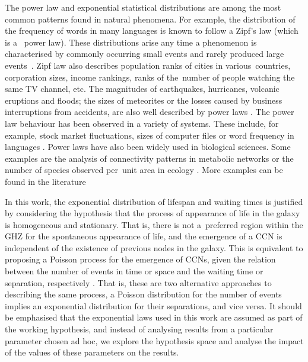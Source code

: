 \documentclass[crop]{CSLB}
\newcommand{\ceti}{CCN}
\newcommand{\cetis}{CCNs}
\begin{document}
The power law and exponential statistical distributions are among the most common patterns found in natural phenomena.
%
For example, the distribution of the frequency of words in many languages is known to follow a Zipf’s law (which is a 
power law).
%
These distributions arise any time a phenomenon is characterised by commonly occurring small events and rarely produced
large events \citep[e.g. ][]{adamic_zipf_2000}.
%
Zipf law also describes population ranks of cities in various countries, corporation sizes, income rankings, ranks of
the number of people watching the same TV channel, etc.
%
The magnitudes of earthquakes, hurricanes, volcanic eruptions and floods; the sizes of meteorites or the losses caused
by business interruptions from accidents, are also well described by power laws
\citep{sornette_critical_2006}.
%
The power law behaviour has been observed in a variety of systems.
%
These include, for example, stock market fluctuations, sizes of computer files or word frequency in languages
\citep{mitzenmacher_brief_2004, newman_power_2005, simkin_theory_2006}. 
%
Power laws have also been widely used in
biological sciences.
%
Some examples are the analysis of connectivity patterns in metabolic networks \citep{jeong_large_2000} or the number of
species observed per unit area in ecology \citep{martin_origin_2006, frank_common_2009}.
%
More examples can be found in the literature 
\citep{martin_origin_2006, maccone_KLT_2010}
\citep{barabasi_scale_2009, maccone_evolution_2014}
\citep{maccone_lognormals_2014}


In this work, the exponential distribution of lifespan and waiting times is justified by considering the hypothesis that the process of appearance of life in the galaxy is homogeneous and stationary. That is, there is not a preferred region within the GHZ for the spontaneous appearance of life, and the emergence of a \ceti{} is independent of the existence of previous nodes in the galaxy. This is equivalent to proposing a Poisson process for the emergence of \cetis{}, given the relation between the number of events in time or space and the waiting time or separation, respectively
\citep[e.g., ][]{ross_simulation_2012}. That is, these are two alternative approaches to describing the same process, a Poisson distribution for the number of events implies an exponential distribution for their separations, and vice versa. It should be emphasised that the exponential laws used in this work are assumed as part of the working hypothesis, and instead of analysing results from a particular parameter chosen ad hoc, we explore the hypothesis space and analyse the impact of the values of these parameters on the results.
\end{document}
